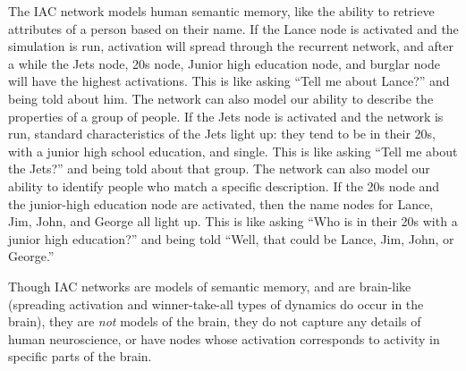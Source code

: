 The IAC network models human semantic memory, like the ability to retrieve attributes of a person based on their name. If the Lance node is activated and the simulation is run, activation will spread through the recurrent network, and after a while the Jets node, 20s node, Junior high education node, and burglar node will have the highest activations. This is like asking ``Tell me about Lance?'' and being told about him. The network can also model our ability to describe the properties of a group of people. If the Jets node is activated and the network is run, standard characteristics of the Jets light up: they tend to be in their 20s, with a junior high school education, and single. This is like asking ``Tell me about the Jets?'' and being told about that group. The network can also model our ability to identify people who match a specific description. If the 20s node and the junior-high education node are activated, then the name nodes for Lance, Jim, John, and George all light up. This is like asking ``Who is in their 20s with a junior high education?'' and being told ``Well, that could be Lance, Jim, John, or George.''

Though IAC networks are models of semantic memory, and are brain-like (spreading activation and winner-take-all types of dynamics do occur in the brain), they are \emph{not} models of the brain, they do not capture any details of human neuroscience, or have nodes whose activation corresponds to activity in specific parts of the brain.

